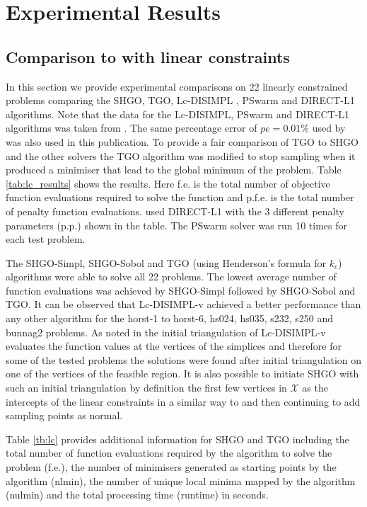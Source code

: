 \chapter{Experimental Results} \label{sec:results}
\section{Comparison to with linear constraints}

In this section we provide experimental comparisons on 22 linearly constrained problems comparing the SHGO, TGO, Lc-DISIMPL \cite{Paul2016}, PSwarm \cite{Vaz2008} and DIRECT-L1 \cite{finkel2003direct} algorithms. Note that the data for the Lc-DISIMPL, PSwarm and DIRECT-L1 algorithms was taken from \cite{Paul2016}. The same percentage error of $pe = 0.01\%$ used by \cite{Paul2016} was also used in this publication. To provide a fair comparison of TGO to SHGO and the other solvers the TGO algorithm was modified to stop sampling when it produced a minimiser that lead to the global minimum of the problem. Table \ref{tab:lc_results} shows the results. Here f.e. is the total number of objective function evaluations required to solve the function and p.f.e. is the total number of penalty function evaluations. \cite{Paul2016} used DIRECT-L1 with the 3 different penalty parameters (p.p.) shown in the table. The PSwarm solver was run 10 times for each test problem. 

The SHGO-Simpl, SHGO-Sobol and TGO (using Henderson's formula for $k_c$) algorithms were able to solve all 22 problems. The lowest average number of function evaluations was achieved by SHGO-Simpl followed by SHGO-Sobol and TGO. It can be observed that Lc-DISIMPL-v achieved a better performance than any other algorithm for the horst-1 to horst-6, hs024, hs035, s232, s250 and bunnag2 problems. As noted in \cite{Paul2016} the initial triangulation of Lc-DISIMPL-v evaluates the function values at the vertices of the simplices and therefore for some of the tested problems the solutions were found after initial triangulation on one of the vertices of the feasible region. It is also possible to initiate SHGO with such an initial triangulation by definition the first few vertices in $\mathcal{X}$ as the intercepts of the linear constraints in a similar way to \cite{Paul2016} and then continuing to add sampling points as normal.

Table \ref{tb:lc} provides additional information for SHGO and TGO including the total number of function evaluations required by the algorithm to solve the problem (f.e.), the number of minimisers generated as starting points by the algorithm (nlmin), the number of unique local minima mapped by the algorithm (nulmin) and the total processing time (runtime) in seconds.

